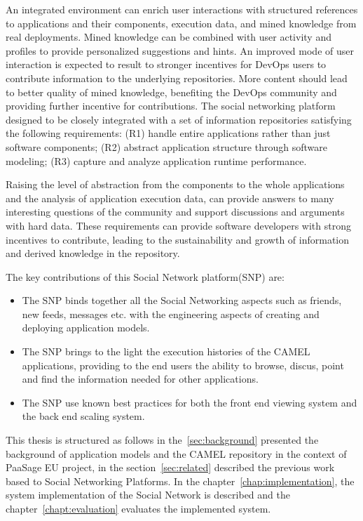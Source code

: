 An integrated environment can enrich user interactions with structured references to applications and their components, execution data, and mined knowledge from real deployments. Mined knowledge can be combined with user activity and profiles to provide personalized suggestions and hints.  An improved mode of user interaction is expected to result to stronger incentives for DevOps users to contribute information to the underlying repositories. More content should lead to better quality of mined knowledge, benefiting the DevOps community and providing further incentive for contributions.  The social networking platform designed to be closely integrated with a set of information repositories satisfying the following requirements: 
(R1) handle entire applications rather than just software components; (R2) abstract application structure through software modeling; (R3) capture and analyze application runtime performance. 

Raising the level of abstraction from the components to the whole applications and the analysis of application execution data, can provide answers to many interesting questions of the community and support discussions and arguments with hard data. 
These requirements can provide software developers with strong incentives to contribute, leading to the sustainability and growth of information and derived knowledge in the repository.

The key contributions of this Social Network platform(SNP) are:
\begin{itemize}
\item The SNP binds together all the Social Networking aspects such as friends, new feeds, messages etc. with the engineering aspects of creating and deploying application models.
\item The SNP brings to the light the execution histories of the CAMEL applications, providing to the end users the ability to browse, discus, point and find the information needed for other applications.
\item The SNP use known best practices for both the front end viewing system and the back end scaling system. 
\end{itemize}

This thesis is structured as follows in the~\ref{sec:background} presented the background of application models and the CAMEL repository in the context of PaaSage EU project, in the section~\ref{sec:related} described the previous work based to Social Networking Platforms. In the chapter~\ref{chap:implementation}, the system implementation of the Social Network is described and the chapter~\ref{chapt:evaluation} evaluates the implemented system.

